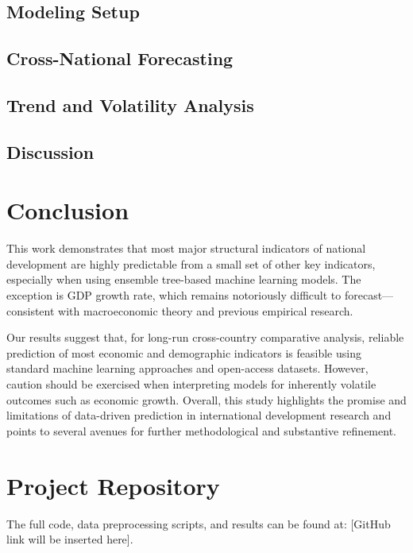 \documentclass[12pt]{article}
\begin{document}
\subsection{Modeling Setup}

\subsection{Cross-National Forecasting}

\subsection{Trend and Volatility Analysis}

\subsection{Discussion}

\section{Conclusion}

This work demonstrates that most major structural indicators of national development are highly predictable from a small set of other key indicators, especially when using ensemble tree-based machine learning models. The exception is GDP growth rate, which remains notoriously difficult to forecast—consistent with macroeconomic theory and previous empirical research.

Our results suggest that, for long-run cross-country comparative analysis, reliable prediction of most economic and demographic indicators is feasible using standard machine learning approaches and open-access datasets. However, caution should be exercised when interpreting models for inherently volatile outcomes such as economic growth. Overall, this study highlights the promise and limitations of data-driven prediction in international development research and points to several avenues for further methodological and substantive refinement.


\section*{Project Repository}
The full code, data preprocessing scripts, and results can be found at: [GitHub link will be inserted here].





\end{document}
